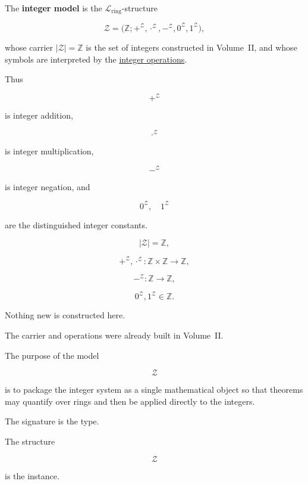 \begin{definition}
\label{def:integer-model}

The \textbf{integer model} is the
$\mathcal{L}_{\mathrm{ring}}$-structure

\[
\mathcal{Z}
=
\bigl(
\mathbb{Z};
+^{\mathcal Z},
\cdot^{\mathcal Z},
-^{\mathcal Z},
0^{\mathcal Z},
1^{\mathcal Z}
\bigr),
\]

whose carrier $|\mathcal Z|=\mathbb Z$ is the set of integers constructed in
Volume~II, and whose symbols are interpreted by the
\hyperref[def:integer-operations]{integer operations}.

Thus

\[
+^{\mathcal Z}
\]

is integer addition,

\[
\cdot^{\mathcal Z}
\]

is integer multiplication,

\[
-^{\mathcal Z}
\]

is integer negation, and

\[
0^{\mathcal Z},
\quad
1^{\mathcal Z}
\]

are the distinguished integer constants.
\end{definition}


\begin{remark*}

\[
|\mathcal Z|
=
\mathbb Z,
\]

\[
+^{\mathcal Z},
\cdot^{\mathcal Z}
:
\mathbb Z\times\mathbb Z
\to
\mathbb Z,
\]

\[
-^{\mathcal Z}
:
\mathbb Z
\to
\mathbb Z,
\]

\[
0^{\mathcal Z},
1^{\mathcal Z}
\in
\mathbb Z.
\]

\end{remark*}


\begin{remark*}[Interpretation]

Nothing new is constructed here.

The carrier and operations were already built in Volume~II.

The purpose of the model

\[
\mathcal Z
\]

is to package the integer system as a single mathematical object so that
theorems may quantify over rings and then be applied directly to the integers.

The signature is the type.

The structure

\[
\mathcal Z
\]

is the instance.

\end{remark*}

